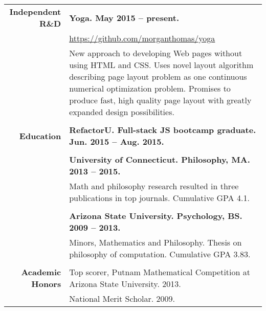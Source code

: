 \documentclass{article}
\begin{document}
\begin{tabular}{rl}
  {\bf Independent R\&D} & {\bf Yoga. May 2015 -- present.} \\ & \href{https://github.com/morganthomas/yoga}{https://github.com/morganthomas/yoga} \\
  & \parbox{4.5in}{New approach to developing Web pages without using HTML and CSS. Uses novel layout algorithm describing page layout problem as one continuous numerical optimization problem. Promises to produce fast, high quality page layout with greatly expanded design possibilities.} \\ \\

  {\bf Education} & {\bf RefactorU. Full-stack JS bootcamp graduate. Jun. 2015 -- Aug. 2015.} \\ \\
  & {\bf University of Connecticut. Philosophy, MA. 2013 -- 2015.} \\
  & \parbox{4.5in}{Math and philosophy research resulted in three publications in top journals. Cumulative GPA 4.1.} \\ \\

  & {\bf Arizona State University. Psychology, BS. 2009 -- 2013.} \\
  & \parbox{4.5in}{Minors, Mathematics and Philosophy. Thesis on philosophy of computation. Cumulative GPA 3.83.} \\ \\



  {\bf Academic Honors} & Top scorer, Putnam Mathematical Competition at Arizona State University. 2013. \\
   & National Merit Scholar. 2009.
\end{tabular}
\egroup
\end{document}
